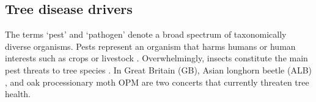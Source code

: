 



\subsection{Tree disease drivers}


The terms `pest' and `pathogen' denote a broad spectrum of taxonomically diverse organisms. 
Pests represent an organism that harms humans or human interests such as crops or livestock
\cite{buckle2015rodent, oerke2006crop, de1964biological}. Overwhelmingly, insects constitute the main
pest threats to tree species \cite{metcalf1994introduction}. In Great Britain (GB), Asian longhorn beetle
(ALB) \cite{haack2010managing}, and oak processionary moth OPM \cite{tomlinson2015managing} are two concerts
that currently threaten tree health.

